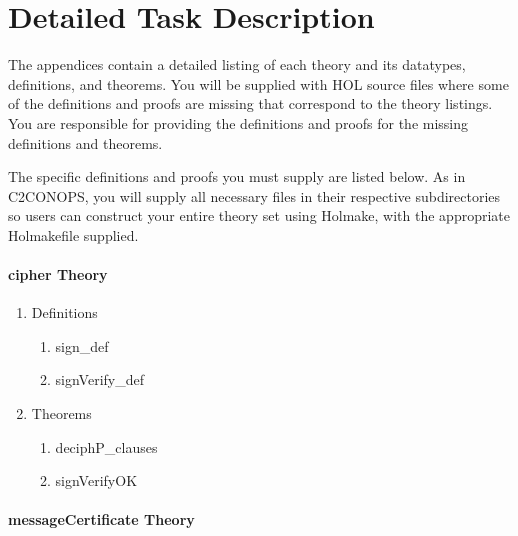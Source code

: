 \message{ !name(secureMessages.tex)}\documentclass[10pt,twoside]{article}
\begin{document}
\section{Detailed Task Description}
\label{sec:task-description}

The appendices contain a detailed listing of each theory and its
datatypes, definitions, and theorems.  You will be supplied with HOL
source files where some of the definitions and proofs are missing that
correspond to the theory listings.  You are responsible for providing
the definitions and proofs for the missing definitions and theorems.

The specific definitions and proofs you must supply are listed
below. As in C2CONOPS, you will supply all necessary files in their
respective subdirectories so users can construct your entire theory
set using Holmake, with the appropriate Holmakefile supplied.

\paragraph{cipher Theory}

\begin{enumerate}
\item Definitions
  \begin{enumerate}[{a.}]
  \item sign\_def
  \item signVerify\_def
  \end{enumerate}
\item Theorems
  \begin{enumerate}[{a.}]
  \item deciphP\_clauses
  \item signVerifyOK
  \end{enumerate}
\end{enumerate}

\paragraph{messageCertificate Theory}
\end{document}
